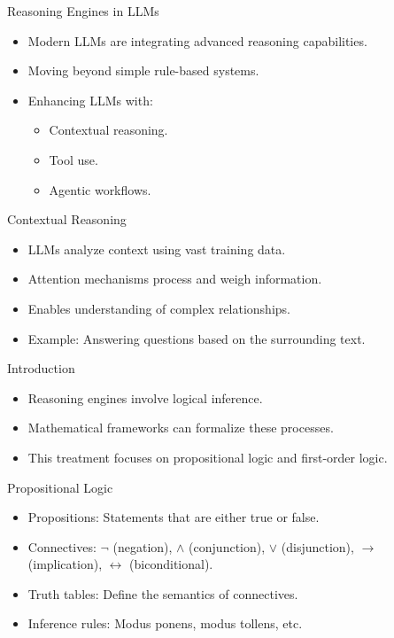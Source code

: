 \begin{frame}{Reasoning Engines in LLMs}
  \begin{itemize}
    \item Modern LLMs are integrating advanced reasoning capabilities.
    \item Moving beyond simple rule-based systems.
    \item Enhancing LLMs with:
      \begin{itemize}
        \item Contextual reasoning.
        \item Tool use.
        \item Agentic workflows.
      \end{itemize}
  \end{itemize}
\end{frame}

\begin{frame}{Contextual Reasoning}
  \begin{itemize}
    \item LLMs analyze context using vast training data.
    \item Attention mechanisms process and weigh information.
    \item Enables understanding of complex relationships.
    \item Example: Answering questions based on the surrounding text.
  \end{itemize}
\end{frame}
\begin{frame}{Introduction}
  \begin{itemize}
    \item Reasoning engines involve logical inference.
    \item Mathematical frameworks can formalize these processes.
    \item This treatment focuses on propositional logic and first-order logic.
  \end{itemize}
\end{frame}

\begin{frame}{Propositional Logic}
  \begin{itemize}
    \item Propositions: Statements that are either true or false.
    \item Connectives: $\neg$ (negation), $\wedge$ (conjunction), $\vee$ (disjunction), $\rightarrow$ (implication), $\leftrightarrow$ (biconditional).
    \item Truth tables: Define the semantics of connectives.
    \item Inference rules: Modus ponens, modus tollens, etc.
  \end{itemize}
\end{frame}

